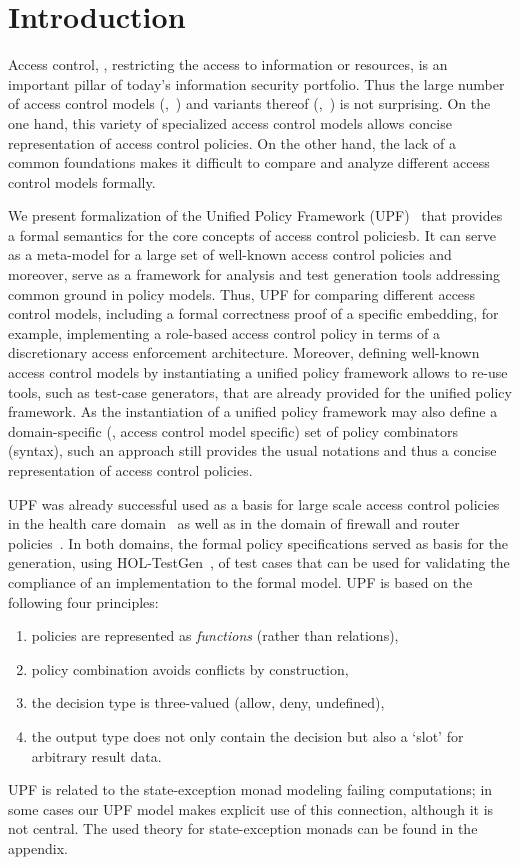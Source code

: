 \chapter{Introduction}
Access control, \ie, restricting the access to information or
resources, is an important pillar of today's information security
portfolio. Thus the large number of access control models
(\eg,~\cite{moyer.ea:generalized:2001,sandhu.ea:arbac97:1999,
  sandhu.ea:nist:2000,ansi:rbac:2004,bell:looking:2005,bell.ea:secure:1996,oasis:xacml:2005,li.ea:critique:2007})
and variants thereof
(\eg,~\cite{ferreira.ea:how:2009,wainer.ea:dw-rbac:2007,ardagna.ea:access:2010,samuel.ea:context-aware:2008,bertino.ea:trbac:2001,ardagna.ea:access:2010,becker:information:2007})
is not surprising. On the one hand, this variety of specialized access
control models allows concise representation of access control
policies. On the other hand, the lack of a common foundations makes it
difficult to compare and analyze different access control models
formally.

We present formalization of the Unified Policy Framework
(UPF)~\cite{bruegger:generation:2012} that provides a formal semantics
for the core concepts of access control policiesb. It can serve as a
meta-model for a large set of well-known access control
policies and moreover, serve as a framework for analysis and test 
generation tools addressing common ground in policy models. 
Thus, UPF for comparing different access control models,
including a formal correctness proof of a specific embedding, for
example, implementing a role-based access control policy in terms of a
discretionary access enforcement architecture. Moreover, defining
well-known access control models by instantiating a unified policy
framework allows to re-use tools, such as test-case generators, that
are already provided for the unified policy framework. As the
instantiation of a unified policy framework may also define a
domain-specific (\ie, access control model specific) set of policy
combinators (syntax), such an approach still provides the usual
notations and thus a concise representation of access control
policies.

UPF was already successful used as a basis for large scale access
control policies in the health care
domain~\cite{brucker.ea:model-based:2011} as well as in the domain of
firewall and router
policies~\cite{brucker.ea:formal-fw-testing:2014}. In both domains,
the formal policy specifications served as basis for the generation,
using {HOL-TestGen}~\cite{brucker.ea:theorem-prover:2012}, of test
cases that can be used for validating the compliance of an
implementation to the formal model. UPF is based on the following four
principles:
\begin{enumerate}
\item policies are represented as \emph{functions} (rather than relations),
\item policy combination avoids conflicts by construction,
\item the decision type is three-valued (allow, deny, undefined),
\item the output type does not only contain the decision but also a
      `slot' for arbitrary result data.
\end{enumerate}

UPF is related to the state-exception monad modeling failing computations; 
in some cases our UPF model makes explicit use of this connection, although it
is not central. The used theory for state-exception monads can be found in the 
appendix.
